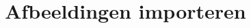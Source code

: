 \documentclass[t]{beamer}
\begin{document}
\begin{frame}
{\begin{columns}
\begin{column}[T]{0.4\textwidth}
				\end{column}
			\end{columns}
		}
	\end{frame}
	\section{Afbeeldingen importeren}



\end{document}
